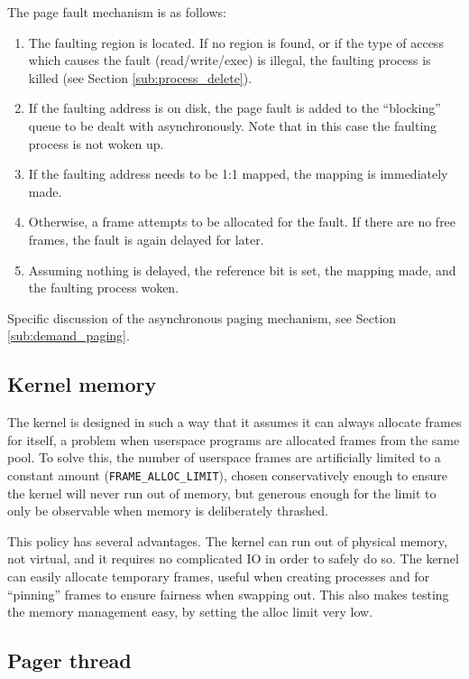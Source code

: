 \documentclass[12pt,english]{article}
\begin{document}
The page fault mechanism is as follows:
\begin{enumerate}
\item The faulting region is located.  If no region is found, or if the type of access which causes the fault (read/write/exec) is illegal, the faulting process is killed (see Section \ref{sub:process_delete}).
\item If the faulting address is on disk, the page fault is added to the ``blocking'' queue to be dealt with asynchronously.  Note that in this case the faulting process is not woken up.
\item If the faulting address needs to be 1:1 mapped, the mapping is immediately made.
\item Otherwise, a frame attempts to be allocated for the fault.  If there are no free frames, the fault is again delayed for later.
\item Assuming nothing is delayed, the reference bit is set, the mapping made, and the faulting process woken.
\end{enumerate}

Specific discussion of the asynchronous paging mechanism, see Section \ref{sub:demand_paging}.

\subsection{Kernel memory}

The kernel is designed in such a way that it assumes it can always allocate frames for itself, a problem when userspace programs are allocated frames from the same pool.  To solve this, the number of userspace frames are artificially limited to a constant amount (\texttt{FRAME\_ALLOC\_LIMIT}), chosen conservatively enough to ensure the kernel will never run out of memory, but generous enough for the limit to only be observable when memory is deliberately thrashed.

This policy has several advantages.  The kernel can run out of physical memory, not virtual, and it requires no complicated IO in order to safely do so.  The kernel can easily allocate temporary frames, useful when creating processes and for ``pinning'' frames to ensure fairness when swapping out.  This also makes testing the memory management easy, by setting the alloc limit very low.

\subsection{Pager thread}
\end{document}
